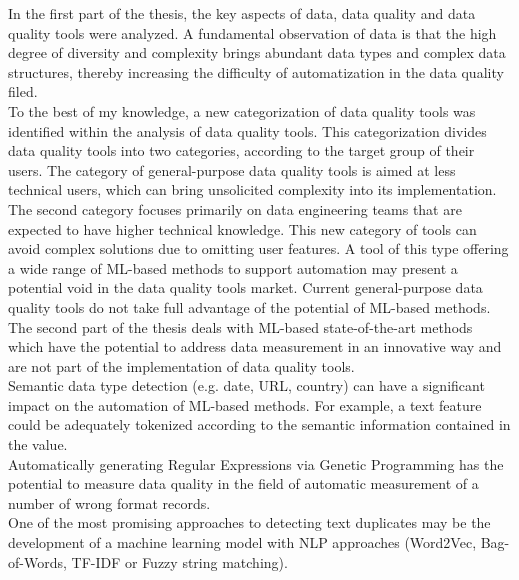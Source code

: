 \label{Conclusion}

In the first part of the thesis, the key aspects of data, data quality and data quality tools were analyzed. A fundamental observation of data is that the high degree of diversity and complexity brings abundant data types and complex data structures, thereby increasing the difficulty of automatization in the data quality filed.\\
\hspace*{5mm} To the best of my knowledge, a new categorization of data quality tools was identified within the analysis of data quality tools. This categorization divides data quality tools into two categories, according to the target group of their users. The category of general-purpose data quality tools is aimed at less technical users, which can bring unsolicited complexity into its implementation.\\
\hspace*{5mm} The second category focuses primarily on data engineering teams that are expected to have higher technical knowledge. This new category of tools can avoid complex solutions due to omitting user features. A tool of this type offering a wide range of ML-based methods to support automation may present a potential void in the data quality tools market. Current general-purpose data quality tools do not take full advantage of the potential of ML-based methods.\\
\hspace*{5mm} The second part of the thesis deals with ML-based state-of-the-art methods which have the potential to address data measurement in an innovative way and are not part of the implementation of data quality tools.\\
\hspace*{5mm} Semantic data type detection (e.g. date, URL, country) can have a significant impact on the automation of ML-based methods. For example, a text feature could be adequately tokenized according to the semantic information contained in the value.\\
\hspace*{5mm} Automatically generating Regular Expressions via Genetic Programming has the potential to measure data quality in the field of automatic measurement of a number of wrong format records.\\
\hspace*{5mm} One of the most promising approaches to detecting text duplicates may be the development of a machine learning model with NLP approaches (Word2Vec, Bag-of-Words, TF-IDF or Fuzzy string matching).\\
